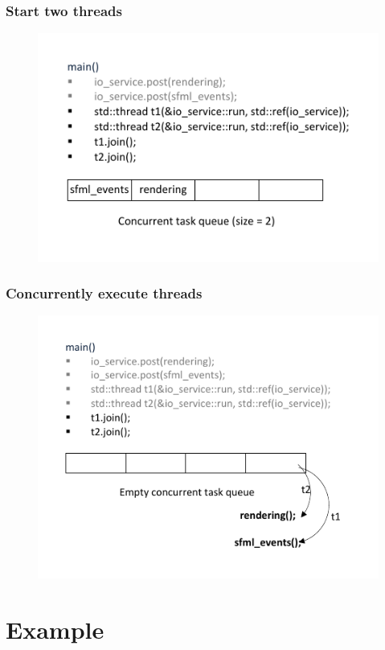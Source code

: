 \documentclass[xcolor=dvipsnames]{beamer}
\begin{document}
\begin{frame}
\frametitle{Start two threads}
\begin{figure}[p]
  \centering
  \includegraphics{images/queue-frame7.pdf}
\end{figure}
\end{frame}

\begin{frame}
\frametitle{Concurrently execute threads}
\begin{figure}[p]
  \centering
  \includegraphics{images/queue-frame8.pdf}
\end{figure}
\end{frame}

\section{Example}
\end{document}
